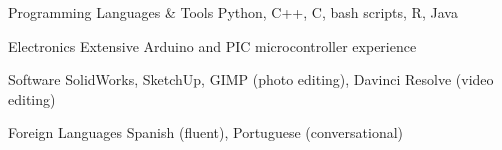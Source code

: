 
\begin{cvskills}
  \cvskill
    {Programming Languages \& Tools} %
    {Python, C++, C, bash scripts, R, Java} %

  \cvskill
    {Electronics}
    {Extensive Arduino and PIC microcontroller experience}

  \cvskill
    {Software}
    {SolidWorks, SketchUp, GIMP (photo editing), Davinci Resolve (video editing)}

  \cvskill
    {Foreign Languages}
    {Spanish (fluent), Portuguese (conversational)}


\end{cvskills}
